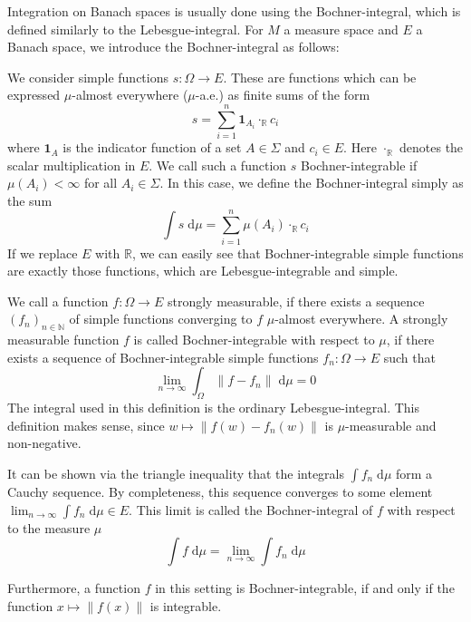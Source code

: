 Integration on Banach spaces is usually done using the Bochner-integral, which is defined similarly to the Lebesgue-integral. For $M$ a measure space and $E$ a Banach space, we introduce the Bochner-integral as follows:

\vspace{0.3cm}

We consider simple functions $s : \Omega \rightarrow E$. These are functions which can be expressed $\mu$-almost everywhere ($\mu$-a.e.) as finite sums of the form
\[
	s = \sum_{i=1}^n \mathbf{1}_{A_i} \cdot_\mathbb{R} c_i
\]
where $\mathbf{1}_A$ is the indicator function of a set $A \in \Sigma$ and $c_i \in E$. Here $\cdot_\mathbb{R}$ denotes the scalar multiplication in $E$. We call such a function $s$ Bochner-integrable if $\mu(A_i) < \infty$ for all $A_i \in \Sigma$. In this case, we define the Bochner-integral simply as the sum
\[
	\int s \; \textrm{d}\mu = \sum_{i=1}^n \mu(A_i) \cdot_\mathbb{R} c_i
\]
If we replace $E$ with $\mathbb{R}$, we can easily see that Bochner-integrable simple functions are exactly those functions, which are Lebesgue-integrable and simple.
\vspace{0.2cm}

We call a function $f : \Omega \rightarrow E$ strongly measurable, if there exists a sequence $(f_n)_{n\in\mathbb{N}}$ of simple functions converging to $f$ $\mu$-almost everywhere.
A strongly measurable function $f$ is called Bochner-integrable with respect to $\mu$, if there exists a sequence of Bochner-integrable simple functions $f_n : \Omega \rightarrow E$ such that
\[
	\lim_{n \to \infty} \int_\Omega \lVert f - f_n \rVert \; \textrm{d}\mu = 0
\]
The integral used in this definition is the ordinary Lebesgue-integral. This definition makes sense, since $w \mapsto \lVert f(w) - f_n(w) \rVert$ is $\mu$-measurable and non-negative.

It can be shown via the triangle inequality that the integrals $\int f_n\; \textrm{d}\mu$ form a Cauchy sequence. By completeness, this sequence converges to some element $\lim_{n \to \infty} \int f_n \; \textrm{d}\mu \in E$. This limit is called the Bochner-integral of $f$ with respect to the measure $\mu$
\[
	\int f \; \textrm{d}\mu = \lim_{n \to \infty} \int f_n \; \textrm{d}\mu
\]

Furthermore, a function $f$ in this setting is Bochner-integrable, if and only if the function $x \mapsto \lVert f(x) \rVert$ is integrable.

\vspace{0.3cm}

